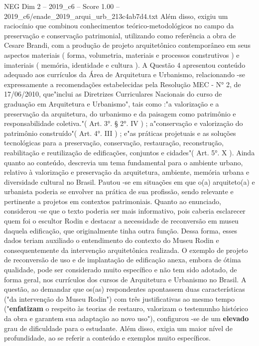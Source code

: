 \begin{textsample}{NEG Dim 2 – 2019\_c6 – Score 1.00 – 2019\_c6/enade\_2019\_arqui\_urb\_213c4ab7d4.txt}
Além disso, exigiu um raciocínio que combinou conhecimentos teórico-metodológicos no campo da preservação e conservação patrimonial, utilizando como referência a obra de Cesare Brandi, com a produção de projeto arquitetônico contemporâneo em seus aspectos materiais ( forma, volumetria, materiais e processos construtivos ) e imateriais ( memória, identidade e cultura ).
A Questão 4 apresentou conteúdo adequado aos currículos da Área de Arquitetura e Urbanismo, relacionando -se expressamente a recomendações estabelecidas pela Resolução MEC - N{\EmojiFont °} 2, de 17/06/2010, que"inclui as Diretrizes Curriculares Nacionais do curso de graduação em Arquitetura e Urbanismo", tais como :"a valorização e a preservação da arquitetura, do urbanismo e da paisagem como patrimônio e responsabilidade coletiva."( Art. 3{\EmojiFont °}. § 2{\EmojiFont °}.
IV ) ; a"conservação e valorização do patrimônio construído"( Art. 4{\EmojiFont °}.
III ) ; e"as práticas projetuais e as soluções tecnológicas para a preservação, conservação, restauração, reconstrução, reabilitação e reutilização de edificações, conjuntos e cidades"( Art. 5{\EmojiFont °}.
X ).
Ainda quanto ao conteúdo, descrevia um tema fundamental para o ambiente urbano, relativo à valorização e preservação da arquitetura, ambiente, memória urbana e diversidade cultural no Brasil.
Pautou -se em situações em que o(a) arquiteto(a) e urbanista poderia se envolver na prática de sua profissão, sendo relevante e pertinente a projetos em contextos patrimoniais.
Quanto ao enunciado, considerou -se que o texto poderia ser mais informativo, pois caberia esclarecer quem foi o escultor Rodin e destacar a necessidade de reconversão em museu daquela edificação, que originalmente tinha outra função.
Dessa forma, esses dados teriam auxiliado o entendimento do contexto do Museu Rodin e consequentemente da intervenção arquitetônica realizada.
O exemplo de projeto de reconversão de uso e de implantação de edificação anexa, embora de ótima qualidade, pode ser considerado muito específico e não tem sido adotado, de forma geral, nos currículos dos cursos de Arquitetura e Urbanismo no Brasil.
A questão, ao demandar que os(as) respondentes apontassem duas características ("da intervenção do Museu Rodin") com três justificativas ao mesmo tempo ("\textbf{enfatizam} o respeito às teorias de restauro, valorizam o testemunho histórico da obra e garantem sua adaptação ao novo uso"), configurou -se de um \textbf{elevado} grau de dificuldade para o estudante.
Além disso, exigia um maior nível de profundidade, ao se referir a conteúdo e exemplos muito específicos.

\end{textsample}
